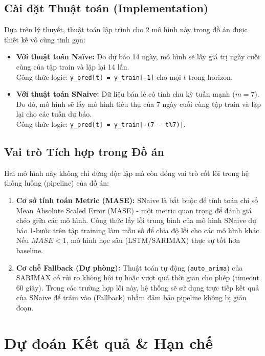 \documentclass[12pt,a4paper]{article}
\begin{document}
    \subsection{Cài đặt Thuật toán (Implementation)}
    Dựa trên lý thuyết, thuật toán lập trình cho 2 mô hình này trong đồ án được thiết kế vô cùng tinh gọn:
    \begin{itemize}
        \item \textbf{Với thuật toán Naïve:} Do dự báo 14 ngày, mô hình sẽ lấy giá trị ngày cuối cùng của tập train và lặp lại 14 lần.\\
        Công thức logic: \texttt{y\_pred[t] = y\_train[-1]} cho mọi $t$ trong horizon.
        \item \textbf{Với thuật toán SNaive:} Dữ liệu bán lẻ có tính chu kỳ tuần mạnh ($m=7$). Do đó, mô hình sẽ lấy mô hình tiêu thụ của 7 ngày cuối cùng tập train và lặp lại cho các tuần dự báo.\\
        Công thức logic: \texttt{y\_pred[t] = y\_train[-(7 - t\%7)]}.
    \end{itemize}

    \subsection{Vai trò Tích hợp trong Đồ án}
    Hai mô hình này không chỉ đứng độc lập mà còn đóng vai trò cốt lõi trong hệ thống luồng (pipeline) của đồ án:
    \begin{enumerate}
        \item \textbf{Cơ sở tính toán Metric (MASE):} SNaive là bắt buộc để tính toán chỉ số Mean Absolute Scaled Error (MASE) - một metric quan trọng để đánh giá chéo giữa các mô hình. Công thức lấy lỗi trung bình của mô hình SNaive dự báo 1-bước trên tập training làm mẫu số để chia độ lỗi cho các mô hình khác. Nếu $MASE < 1$, mô hình học sâu (LSTM/SARIMAX) thực sự tốt hơn baseline.
        \item \textbf{Cơ chế Fallback (Dự phòng):} Thuật toán tự động (\texttt{auto\_arima}) của SARIMAX có rủi ro không hội tụ hoặc vượt quá thời gian cho phép (timeout 60 giây). Trong các trường hợp lỗi này, hệ thống sẽ sử dụng trực tiếp kết quả của SNaive để trám vào (Fallback) nhằm đảm bảo pipeline không bị gián đoạn.
    \end{enumerate}

    \section{Dự đoán Kết quả \& Hạn chế}
\end{document}
